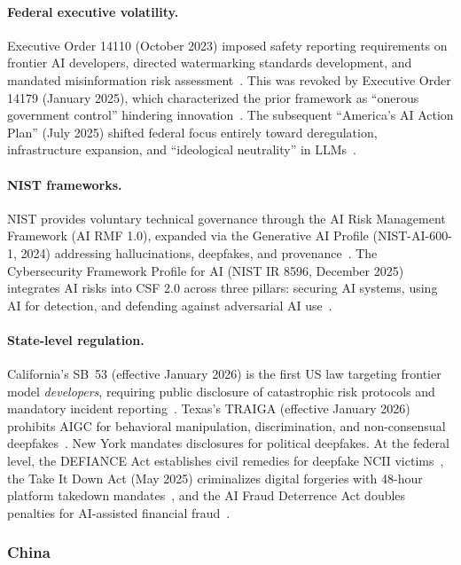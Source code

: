 \paragraph{Federal executive volatility.}
Executive Order 14110 (October 2023) imposed safety reporting requirements on frontier AI developers, directed watermarking standards development, and mandated misinformation risk assessment~\cite{eo14110}. This was revoked by Executive Order 14179 (January 2025), which characterized the prior framework as ``onerous government control'' hindering innovation~\cite{eo14179}. The subsequent ``America's AI Action Plan'' (July 2025) shifted federal focus entirely toward deregulation, infrastructure expansion, and ``ideological neutrality'' in LLMs~\cite{aiactionplan2025}.

\paragraph{NIST frameworks.}
NIST provides voluntary technical governance through the AI Risk Management Framework (AI RMF 1.0), expanded via the Generative AI Profile (NIST-AI-600-1, 2024) addressing hallucinations, deepfakes, and provenance~\cite{nistrmf,nistgenai600}. The Cybersecurity Framework Profile for AI (NIST IR 8596, December 2025) integrates AI risks into CSF 2.0 across three pillars: securing AI systems, using AI for detection, and defending against adversarial AI use~\cite{nist8596}.

\paragraph{State-level regulation.}
California's SB~53 (effective January 2026) is the first US law targeting frontier model \emph{developers}, requiring public disclosure of catastrophic risk protocols and mandatory incident reporting~\cite{casb53}. Texas's TRAIGA (effective January 2026) prohibits AIGC for behavioral manipulation, discrimination, and non-consensual deepfakes~\cite{texastraiga}. New York mandates disclosures for political deepfakes. At the federal level, the DEFIANCE Act establishes civil remedies for deepfake NCII victims~\cite{defianceact}, the Take It Down Act (May 2025) criminalizes digital forgeries with 48-hour platform takedown mandates~\cite{takeitdown2025}, and the AI Fraud Deterrence Act doubles penalties for AI-assisted financial fraud~\cite{aifraudact}.


\subsubsection{China}
\label{sec:gov-china}

